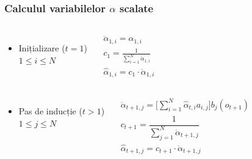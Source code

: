\begin{frame}
  \frametitle{Calculul variabilelor $\alpha$ scalate}
  \begin{columns}%
    \begin{itemize}
    \item Inițializare ($t = 1$)\\\vspace*{1em}$1 \le i \le N$
    \end{itemize}%
    \begin{align}%
      \ddot{\alpha}_{1,i} = \alpha_{1,i}\\
      c_1 = \frac{1}{\displaystyle\sum_{i=1}^{N}
        \ddot{\alpha}_{1,i}} \\
      \hat{\alpha}_{1,i} = c_1 \cdot \ddot{\alpha}_{1,i}
    \end{align}%
  \end{columns}%
  \vspace*{.5em} \pause \horiline
  \begin{columns}
    \begin{itemize}
    \item Pas de inducție ($t > 1$)\\\vspace*{1em}$1 \le j \le N$
    \end{itemize}%
    \begin{align}%
      \ddot{\alpha}_{t+1,j} = \Big[
      \displaystyle\sum_{i=1}^{N}\hat{\alpha}_{t,i}a_{i,j}\Big]
      b_{j}(o_{t+1}) \\
      c_{t+1} = \dfrac{1}{\displaystyle\sum_{j=1}^{N}
        \ddot{\alpha}_{t+1,j}} \\
      \hat{\alpha}_{t+1,j} = c_{t+1} \cdot \ddot{\alpha}_{t+1,j}
    \end{align}%
  \end{columns}%
\end{frame}

